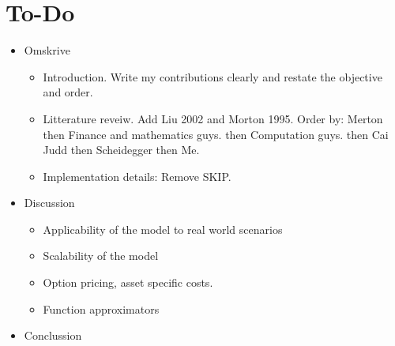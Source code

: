 \documentclass[11pt]{article}
\begin{document}
\section{To-Do}\label{sec:To-Do}
\begin{itemize}
  \item Omskrive
\begin{itemize}
  \item Introduction. Write my contributions clearly and restate the objective and order.
  \item Litterature reveiw. Add Liu 2002 and Morton 1995. Order by: Merton then Finance and mathematics guys. then Computation guys. then Cai Judd then Scheidegger then Me.
  \item Implementation details: Remove SKIP.
\end{itemize}
\item Discussion
\begin{itemize}
  \item Applicability of the model to real world scenarios
  \item Scalability of the model
  \item Option pricing, asset specific costs.
  \item Function approximators 
\end{itemize}
\item Conclussion 
\end{itemize}





% 



\newpage

\begingroup 
  \hypersetup{linkcolor=black}

  \hypersetup{
    colorlinks=true,
    citecolor=black,
    linkcolor=black,
    filecolor=black, 
    urlcolor=black}
  \printbibliography
\endgroup

\newpage


\end{document}
